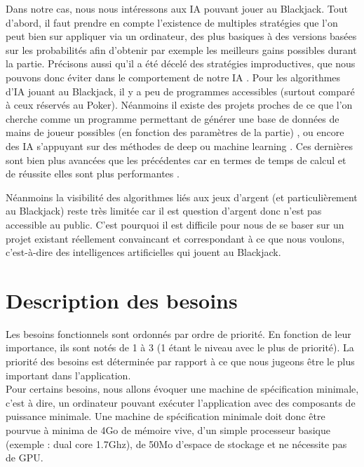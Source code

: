 \documentclass{article}
\begin{document}
Dans notre cas, nous nous intéressons aux IA pouvant jouer au Blackjack. Tout d’abord, il faut prendre en compte l'existence de multiples stratégies que l’on peut bien sur appliquer via un ordinateur, des plus basiques \cite{stratBasique} à des versions basées sur les probabilités \cite{blackjack_statistics} \cite{stratProba} afin d’obtenir par exemple les meilleurs gains possibles durant la partie. Précisons aussi qu’il a été décelé des stratégies improductives, que nous pouvons donc éviter dans le comportement de notre IA \cite{stratNull}.
Pour les algorithmes d’IA jouant au Blackjack, il y a peu de programmes accessibles (surtout comparé à ceux réservés au Poker). Néanmoins il existe des projets proches de ce que l’on cherche comme un programme permettant de générer une base de données de mains de joueur possibles (en fonction des paramètres de la partie) \cite{gitBJDataset}, ou encore des IA s’appuyant sur des méthodes de deep ou machine learning \cite{gitBJmachineLearning}. Ces dernières sont bien plus avancées que les précédentes car en termes de temps de calcul et de réussite elles sont plus performantes  \cite{blogBJmachineLearning}. 

Néanmoins la visibilité des algorithmes liés aux jeux d’argent (et particulièrement au Blackjack) reste très limitée car il est question d’argent donc n’est pas accessible au public.
C’est pourquoi il est difficile pour nous de se baser sur un projet existant réellement convaincant et correspondant à ce que nous voulons, c’est-à-dire des intelligences artificielles qui jouent au Blackjack.


\section{Description des besoins}

Les besoins fonctionnels sont ordonnés par ordre de priorité. En fonction de leur importance, ils sont notés de 1 à 3 (1 étant le niveau avec le plus de priorité). La priorité des besoins est déterminée par rapport à ce que nous jugeons être le plus important dans l'application. \\

Pour certains besoins, nous allons évoquer une machine de spécification minimale, c'est à dire, un ordinateur pouvant exécuter l'application avec des composants de puissance minimale. Une machine de spécification minimale doit donc être pourvue à minima de 4Go de mémoire vive, d'un simple processeur basique (exemple : dual core 1.7Ghz), de 50Mo d'espace de stockage et ne nécessite pas de GPU.
\end{document}
